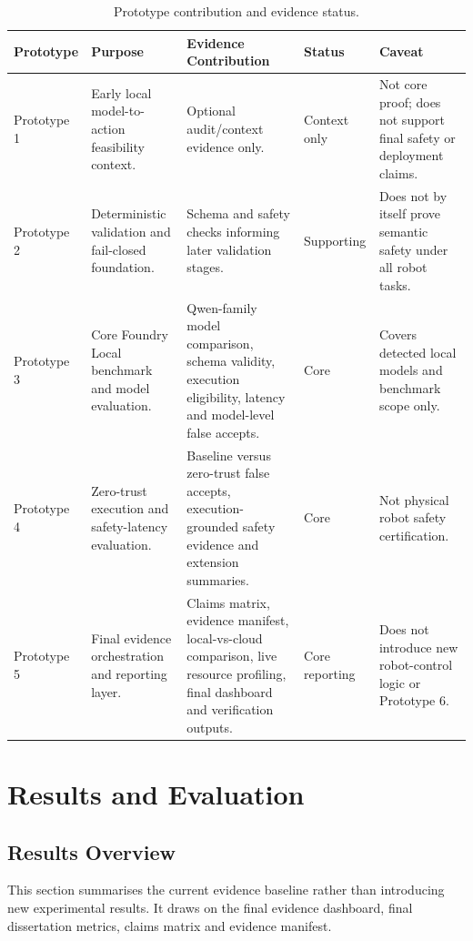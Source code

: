 \documentclass[sigconf,nonacm]{acmart}
\begin{document}
\begin{table}[t]
\centering
\caption{Prototype contribution and evidence status.}
\label{tab:prototype_contribution}
\footnotesize
\begin{tabularx}{\textwidth}{L{0.12\textwidth}Y Y L{0.14\textwidth}Y}
\toprule
Prototype & Purpose & Evidence Contribution & Status & Caveat \\
\midrule
Prototype 1 & Early local model-to-action feasibility context. & Optional audit/context evidence only. & Context only & Not core proof; does not support final safety or deployment claims. \\
Prototype 2 & Deterministic validation and fail-closed foundation. & Schema and safety checks informing later validation stages. & Supporting & Does not by itself prove semantic safety under all robot tasks. \\
Prototype 3 & Core Foundry Local benchmark and model evaluation. & Qwen-family model comparison, schema validity, execution eligibility, latency and model-level false accepts. & Core & Covers detected local models and benchmark scope only. \\
Prototype 4 & Zero-trust execution and safety-latency evaluation. & Baseline versus zero-trust false accepts, execution-grounded safety evidence and extension summaries. & Core & Not physical robot safety certification. \\
Prototype 5 & Final evidence orchestration and reporting layer. & Claims matrix, evidence manifest, local-vs-cloud comparison, live resource profiling, final dashboard and verification outputs. & Core reporting & Does not introduce new robot-control logic or Prototype 6. \\
\bottomrule
\end{tabularx}
\end{table}

\section{Results and Evaluation}

\subsection{Results Overview}
\label{sec:results_overview}

This section summarises the current evidence baseline rather than introducing new experimental results. It draws on the final evidence dashboard, final dissertation metrics, claims matrix and evidence manifest.
\end{document}
